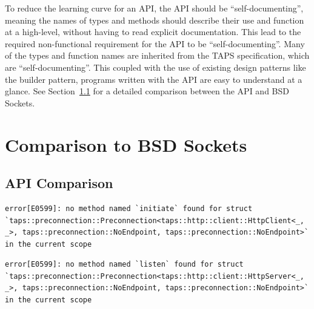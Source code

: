 To reduce the learning curve for an API, the API should be “self-documenting'', meaning the names of types and methods
should describe their use and function at a high-level, without having to read explicit documentation.
This lead to the required non-functional requirement for the API to be “self-documenting''.
Many of the types and function names are inherited from the TAPS specification, which are ``self-documenting''.
This coupled with the use of existing design patterns like the builder pattern, programs written with the API are easy
to understand at a glance.
See Section~\ref{subsec:api-comparison} for a detailed comparison between the API and BSD Sockets.

\section{Comparison to BSD Sockets}\label{sec:comparison-to-bsd-sockets}

\subsection{API Comparison}\label{subsec:api-comparison}



\begin{lstlisting}[float=h, caption={The compiler error produced if a Preconnection without a remote endpoint is used to
initiate a Connection.}, label=lst:clientError]
error[E0599]: no method named `initiate` found for struct `taps::preconnection::Preconnection<taps::http::client::HttpClient<_, _>, taps::preconnection::NoEndpoint, taps::preconnection::NoEndpoint>` in the current scope
\end{lstlisting}

\begin{lstlisting}[float=h, caption={The compiler error produced if a Preconnection without a local endpoint is used to
listen for Connections.}, label=lst:serverError]
error[E0599]: no method named `listen` found for struct `taps::preconnection::Preconnection<taps::http::client::HttpServer<_, _>, taps::preconnection::NoEndpoint, taps::preconnection::NoEndpoint>` in the current scope
\end{lstlisting}

